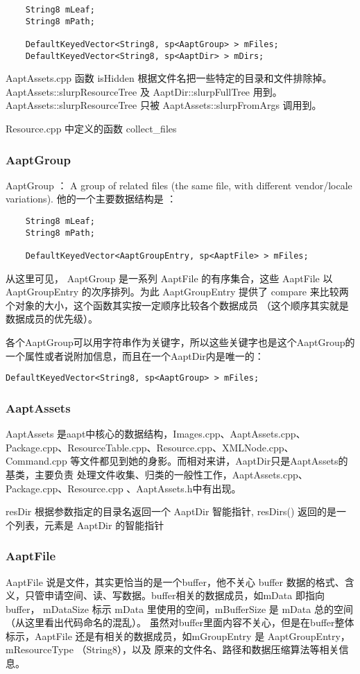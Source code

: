 \documentclass[a4paper,11pt]{article}
\begin{document}
\begin{lstlisting}
    String8 mLeaf;
    String8 mPath;

    DefaultKeyedVector<String8, sp<AaptGroup> > mFiles;
    DefaultKeyedVector<String8, sp<AaptDir> > mDirs;
\end{lstlisting}
AaptAssets.cpp 函数 isHidden 根据文件名把一些特定的目录和文件排除掉。
AaptAssets::slurpResourceTree 及 AaptDir::slurpFullTree 用到。
AaptAssets::slurpResourceTree 只被 AaptAssets::slurpFromArgs 调用到。

Resource.cpp 中定义的函数 collect_files

\subsubsection{AaptGroup}
AaptGroup ： A group of related files (the same file, with different vendor/locale variations).
 他的一个主要数据结构是 ：

\begin{lstlisting}
    String8 mLeaf;
    String8 mPath;

    DefaultKeyedVector<AaptGroupEntry, sp<AaptFile> > mFiles;
\end{lstlisting}
从这里可见， AaptGroup 是一系列 AaptFile 的有序集合，这些 AaptFile 以
AaptGroupEntry 的次序排列。为此 AaptGroupEntry 提供了 compare
来比较两个对象的大小，这个函数其实按一定顺序比较各个数据成员
（这个顺序其实就是数据成员的优先级）。

各个AaptGroup可以用字符串作为关键字，所以这些关键字也是这个AaptGroup的
一个属性或者说附加信息，而且在一个AaptDir内是唯一的：
\begin{lstlisting}[caption=AaptDir的属性]
    DefaultKeyedVector<String8, sp<AaptGroup> > mFiles;
\end{lstlisting}

\subsubsection{AaptAssets}
AaptAssets 是aapt中核心的数据结构，Images.cpp、AaptAssets.cpp、
Package.cpp、ResourceTable.cpp、Resource.cpp、XMLNode.cpp、Command.cpp 
等文件都见到她的身影。而相对来讲，AaptDir只是AaptAssets的基类，主要负责
处理文件收集、归类的一般性工作，AaptAssets.cpp、Package.cpp、Resource.cpp
、AaptAssets.h中有出现。

resDir 根据参数指定的目录名返回一个 AaptDir 智能指针,  resDirs()
返回的是一个列表，元素是 AaptDir 的智能指针

\subsubsection{AaptFile}
AaptFile 说是文件，其实更恰当的是一个buffer，他不关心 buffer
数据的格式、含义，只管申请空间、读、写数据。buffer相关的数据成员，如mData
即指向buffer， mDataSize 标示 mData 里使用的空间，mBufferSize 是 mData
总的空间 （从这里看出代码命名的混乱）。
虽然对buffer里面内容不关心，但是在buffer整体标示，AaptFile
还是有相关的数据成员，如mGroupEntry 是 AaptGroupEntry，mResourceType （String8），以及
原来的文件名、路径和数据压缩算法等相关信息。
\end{document}
